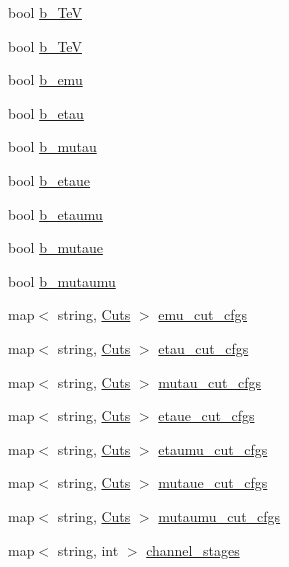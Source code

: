\begin{DoxyCompactItemize}
\item 
bool \hyperlink{classspecialAna_aa8d4b44be61d1e2f53c63a5dfb42382d}{b\-\_\-Te\-V}
\item 
bool \hyperlink{classspecialAna_ac4ed94b197d05282ab2aeed78bea4dad}{b\-\_\-Te\-V}
\item 
bool \hyperlink{classspecialAna_aae4e34dea84468db09355f5c33ac58dd}{b\-\_\-emu}
\item 
bool \hyperlink{classspecialAna_a14aecaa955dbd8cb22e22107c1991ebe}{b\-\_\-etau}
\item 
bool \hyperlink{classspecialAna_ae6b84e17047e8a379fad795966129512}{b\-\_\-mutau}
\item 
bool \hyperlink{classspecialAna_ab6038122295663c5a43fe1e89c86ae36}{b\-\_\-etaue}
\item 
bool \hyperlink{classspecialAna_a1ea533f85d436109263a69b2943b906b}{b\-\_\-etaumu}
\item 
bool \hyperlink{classspecialAna_a3b8dec739eeb3aba67512a275a740978}{b\-\_\-mutaue}
\item 
bool \hyperlink{classspecialAna_a251c50e90dd2f85e67dac70abd219bf9}{b\-\_\-mutaumu}
\item 
map$<$ string, \hyperlink{classCuts}{Cuts} $>$ \hyperlink{classspecialAna_a15d1b215f95e104a1728a3e090ef76df}{emu\-\_\-cut\-\_\-cfgs}
\item 
map$<$ string, \hyperlink{classCuts}{Cuts} $>$ \hyperlink{classspecialAna_aae200ba5c12c48ca4dadc47e657a14fc}{etau\-\_\-cut\-\_\-cfgs}
\item 
map$<$ string, \hyperlink{classCuts}{Cuts} $>$ \hyperlink{classspecialAna_a1cc60d87fb53c47860a45b50f996147f}{mutau\-\_\-cut\-\_\-cfgs}
\item 
map$<$ string, \hyperlink{classCuts}{Cuts} $>$ \hyperlink{classspecialAna_abd425daefdae175f64d5d2ec8eaeb859}{etaue\-\_\-cut\-\_\-cfgs}
\item 
map$<$ string, \hyperlink{classCuts}{Cuts} $>$ \hyperlink{classspecialAna_a649fbc7d8b73e8227e7844a3d7d2f7d5}{etaumu\-\_\-cut\-\_\-cfgs}
\item 
map$<$ string, \hyperlink{classCuts}{Cuts} $>$ \hyperlink{classspecialAna_ae140f6e63d9061ce6b8310f093e163c6}{mutaue\-\_\-cut\-\_\-cfgs}
\item 
map$<$ string, \hyperlink{classCuts}{Cuts} $>$ \hyperlink{classspecialAna_af9e77720216d2b89101572b8b620ab72}{mutaumu\-\_\-cut\-\_\-cfgs}
\item 
map$<$ string, int $>$ \hyperlink{classspecialAna_a58cbc80a0bb41446344e4d9170450974}{channel\-\_\-stages}
\item 

\end{DoxyCompactItemize}
